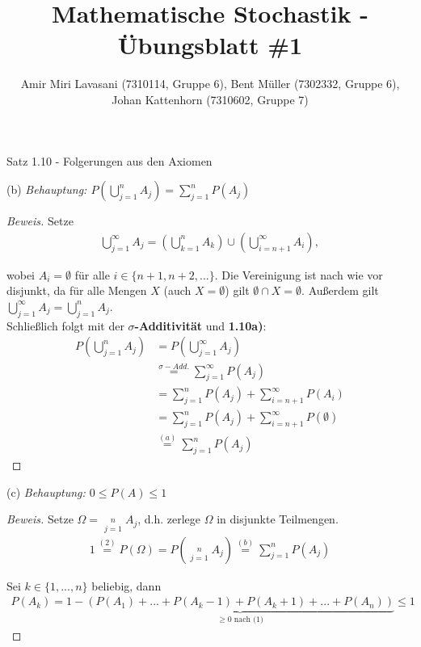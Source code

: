 \documentclass[10pt]{article}
\newenvironment{Aufgabe}[2][Aufgabe]{\begin{trivlist}
\item[\hskip \labelsep {\bfseries #1}\hskip \labelsep {\bfseries #2.}]}{\end{trivlist}}
\begin{document}
 
\title{ \textbf{Mathematische Stochastik - Übungsblatt \#1} }

\author{Amir Miri Lavasani (7310114, Gruppe 6), Bent Müller (7302332, Gruppe 6), \\ 
Johan Kattenhorn (7310602, Gruppe 7)} \maketitle

 
\begin{Aufgabe}{1}
    Satz 1.10 - Folgerungen aus den Axiomen
\end{Aufgabe}

(b) \textit{ Behauptung: $ P\left( \bigcup\limits_{j=1}^{n} A_j \right) = \sum\limits_{j=1}^{n} P(A_j) $ }
\begin{proof}[Beweis]
Setze  
\begin{align*}
    \bigcup\limits_{j=1}^{\infty} A_j = \left( \bigcup\limits_{k=1}^{n} A_k \right) \cup \left( \bigcup\limits_{i=n+1}^{\infty} A_i \right),
\end{align*}

wobei $A_i = \emptyset $ für alle $i\in\{n+1,n+2,...\}$. Die Vereinigung ist nach wie vor disjunkt, da für alle Mengen $X$ (auch $X=\emptyset$) gilt 
$\emptyset \cap X = \emptyset$. Außerdem gilt $ \bigcup\limits_{j=1}^{\infty} A_j = \bigcup\limits_{j=1}^{n} A_j $. \\
Schließlich folgt mit der \textbf{$\sigma$-Additivität} und \textbf{1.10a)}:
\begin{align*}
    P\left( \bigcup\limits_{j=1}^{n} A_j \right) &= P\left( \bigcup\limits_{j=1}^{\infty} A_j \right) \\
                                                 &\stackrel{\sigma-Add.}{=} \sum\limits_{j=1}^{\infty} P(A_j) \\
                                                 &= \sum\limits_{j=1}^{n} P(A_j) + \sum\limits_{i=n+1}^{\infty} P(A_i) \\
                                                 &= \sum\limits_{j=1}^{n} P(A_j) + \sum\limits_{i=n+1}^{\infty} P(\emptyset) \\ 
                                                 &\stackrel{(a)}{=} \sum\limits_{j=1}^{n} P(A_j) 
\end{align*}

\end{proof}

(c) \textit{Behauptung: $0 \leq P(A) \leq 1$}
\begin{proof}[Beweis]
Setze $\Omega = \mathop{\dot\bigcup}\limits_{j=1}^{n} A_j$, d.h. zerlege $\Omega$ in disjunkte Teilmengen. 
\begin{align*}
    1 \stackrel{(2)}{=} P(\Omega) = P\left( \mathop{\dot\bigcup}\limits_{j=1}^{n} A_j \right) \stackrel{(b)}{=} \sum\limits_{j=1}^{n} P(A_j)
\end{align*}

Sei $k\in\{1,...,n\}$ beliebig, dann
\begin{align*}
    P(A_k) = 1 - \underbrace{(P(A_1) +...+ P(A_k-1) + P(A_k+1) +...+ P(A_n))}_\text{$\geq 0$ nach (1)} \leq 1
\end{align*}

\end{proof}
\end{document}
